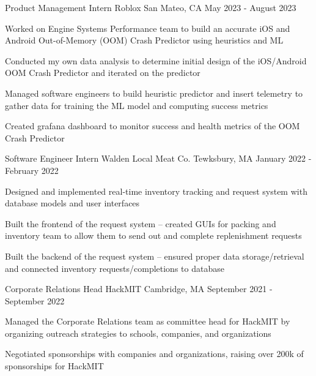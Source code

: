 \documentclass[12pt, letterpaper]{awesome-cv}
\begin{document}
\begin{cventries}
  \cventry
      {Product Management Intern} %
      {Roblox} %
      {San Mateo, CA} %
      {May 2023 - August 2023} %
      {
        \begin{cvitems} %
          \item {Worked on Engine Systems Performance team to build an accurate iOS and Android Out-of-Memory (OOM) Crash Predictor using heuristics and ML}
          \item {Conducted my own data analysis to determine initial design of the iOS/Android OOM Crash Predictor and iterated on the predictor}
          \item {Managed software engineers to build heuristic predictor and insert telemetry to gather data for training the ML model and computing success metrics}
          \item {Created grafana dashboard to monitor success and health metrics of the OOM Crash Predictor}
      \end{cvitems}
    }

  \cventry
      {Software Engineer Intern} %
      {Walden Local Meat Co.} %
      {Tewksbury, MA} %
      {January 2022 - February 2022} %
      {
        \begin{cvitems} %
          \item {Designed and implemented real-time inventory tracking and request system with database models and user interfaces}
          \item {Built the frontend of the request system -- created GUIs for packing and inventory team to allow them to send out and complete replenishment requests}
          \item {Built the backend of the request system -- ensured proper data storage/retrieval and connected inventory requests/completions to database}
      \end{cvitems}
    }

  \cventry
    {Corporate Relations Head} %
    {HackMIT} %
    {Cambridge, MA} %
    {September 2021 - September 2022} %
    {
      \begin{cvitems} %
        \item {Managed the Corporate Relations team as committee head for HackMIT by organizing outreach strategies to schools, companies, and organizations}
        \item {Negotiated sponsorships with companies and organizations, raising over 200k of sponsorships for HackMIT}
      \end{cvitems}
    }


\end{cventries}
\end{document}
